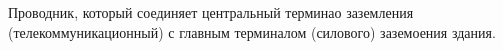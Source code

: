 Проводник, который соединяет центральный терминао заземления 
(телекоммуникационный) с главным терминалом (силового) заземоения здания.